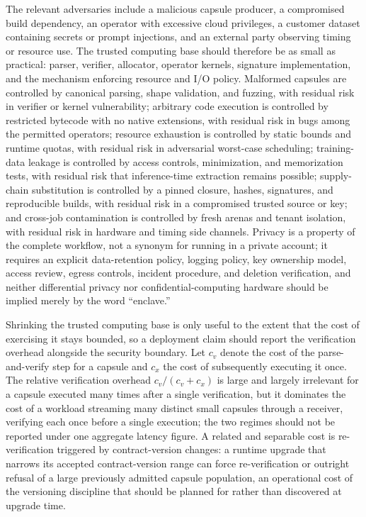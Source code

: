 The relevant adversaries include a malicious capsule producer, a compromised build dependency, an operator with excessive cloud privileges, a customer dataset containing secrets or prompt injections, and an external party observing timing or resource use. The trusted computing base should therefore be as small as practical: parser, verifier, allocator, operator kernels, signature implementation, and the mechanism enforcing resource and I/O policy. Malformed capsules are controlled by canonical parsing, shape validation, and fuzzing, with residual risk in verifier or kernel vulnerability; arbitrary code execution is controlled by restricted bytecode with no native extensions, with residual risk in bugs among the permitted operators; resource exhaustion is controlled by static bounds and runtime quotas, with residual risk in adversarial worst-case scheduling; training-data leakage is controlled by access controls, minimization, and memorization tests, with residual risk that inference-time extraction remains possible; supply-chain substitution is controlled by a pinned closure, hashes, signatures, and reproducible builds, with residual risk in a compromised trusted source or key; and cross-job contamination is controlled by fresh arenas and tenant isolation, with residual risk in hardware and timing side channels. Privacy is a property of the complete workflow, not a synonym for running in a private account; it requires an explicit data-retention policy, logging policy, key ownership model, access review, egress controls, incident procedure, and deletion verification, and neither differential privacy nor confidential-computing hardware should be implied merely by the word ``enclave.''

Shrinking the trusted computing base is only useful to the extent that the cost of exercising it stays bounded, so a deployment claim should report the verification overhead alongside the security boundary. Let $c_v$ denote the cost of the parse-and-verify step for a capsule and $c_x$ the cost of subsequently executing it once. The relative verification overhead $c_v/(c_v+c_x)$ is large and largely irrelevant for a capsule executed many times after a single verification, but it dominates the cost of a workload streaming many distinct small capsules through a receiver, verifying each once before a single execution; the two regimes should not be reported under one aggregate latency figure. A related and separable cost is re-verification triggered by contract-version changes: a runtime upgrade that narrows its accepted contract-version range can force re-verification or outright refusal of a large previously admitted capsule population, an operational cost of the versioning discipline that should be planned for rather than discovered at upgrade time.

